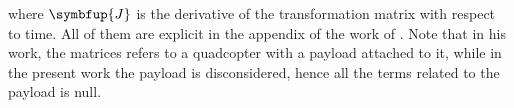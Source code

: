 %
where \(\symbfup{J}\) is the derivative of the transformation matrix with respect to time. All of them are explicit in the appendix of the work of \citet{geronel2023}. Note that in his work, the matrices refers to a quadcopter with a payload attached to it, while in the present work the payload is disconsidered, hence all the terms related to the payload is null.
%


